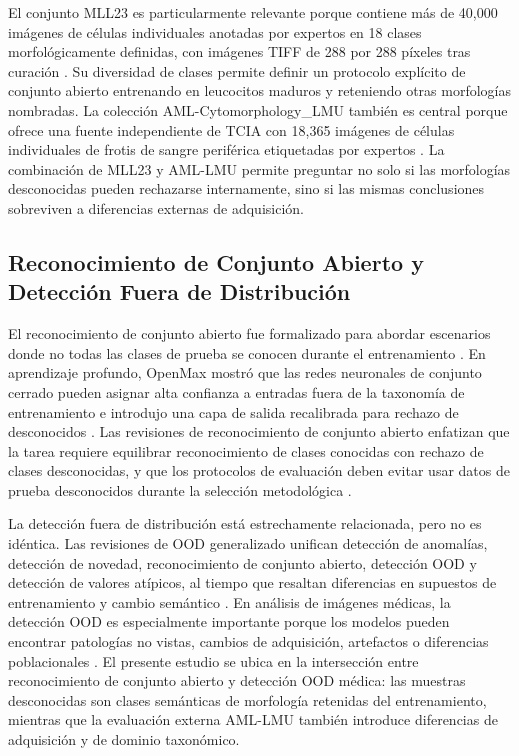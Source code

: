 \documentclass[11pt]{article}
\begin{document}
El conjunto MLL23 es particularmente relevante porque contiene más de 40,000 imágenes de células individuales anotadas por expertos en 18 clases morfológicamente definidas, con imágenes TIFF de 288 por 288 píxeles tras curación \cite{mll23_nature_2025,mll23_zenodo_2024}. Su diversidad de clases permite definir un protocolo explícito de conjunto abierto entrenando en leucocitos maduros y reteniendo otras morfologías nombradas. La colección AML-Cytomorphology\_LMU también es central porque ofrece una fuente independiente de TCIA con 18,365 imágenes de células individuales de frotis de sangre periférica etiquetadas por expertos \cite{aml_lmu_tcia_2019}. La combinación de MLL23 y AML-LMU permite preguntar no solo si las morfologías desconocidas pueden rechazarse internamente, sino si las mismas conclusiones sobreviven a diferencias externas de adquisición.

\subsection{Reconocimiento de Conjunto Abierto y Detección Fuera de Distribución}

El reconocimiento de conjunto abierto fue formalizado para abordar escenarios donde no todas las clases de prueba se conocen durante el entrenamiento \cite{scheirer2013_open_set}. En aprendizaje profundo, OpenMax mostró que las redes neuronales de conjunto cerrado pueden asignar alta confianza a entradas fuera de la taxonomía de entrenamiento e introdujo una capa de salida recalibrada para rechazo de desconocidos \cite{bendale2016_openmax}. Las revisiones de reconocimiento de conjunto abierto enfatizan que la tarea requiere equilibrar reconocimiento de clases conocidas con rechazo de clases desconocidas, y que los protocolos de evaluación deben evitar usar datos de prueba desconocidos durante la selección metodológica \cite{geng2021_osr_survey}.

La detección fuera de distribución está estrechamente relacionada, pero no es idéntica. Las revisiones de OOD generalizado unifican detección de anomalías, detección de novedad, reconocimiento de conjunto abierto, detección OOD y detección de valores atípicos, al tiempo que resaltan diferencias en supuestos de entrenamiento y cambio semántico \cite{yang2024_generalized_ood}. En análisis de imágenes médicas, la detección OOD es especialmente importante porque los modelos pueden encontrar patologías no vistas, cambios de adquisición, artefactos o diferencias poblacionales \cite{hong2024_medical_ood_survey}. El presente estudio se ubica en la intersección entre reconocimiento de conjunto abierto y detección OOD médica: las muestras desconocidas son clases semánticas de morfología retenidas del entrenamiento, mientras que la evaluación externa AML-LMU también introduce diferencias de adquisición y de dominio taxonómico.
\end{document}

